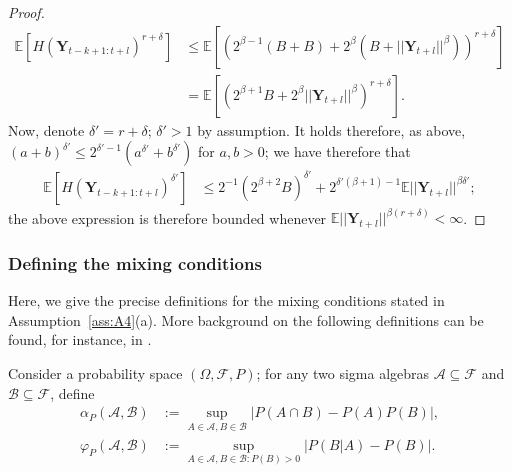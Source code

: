 \documentclass[twoside,11pt]{article}
\newcommand{\E}{\mathbb{E}}
\newcommand{\Ddobs}{\mathbf{Y}}
\begin{document}
\begin{proof}
\begin{equation}
\begin{aligned}
		\E\left[H(\Ddobs_{t-k+1:t+l})^{r+\delta}\right] &\le \E\left[\left(2^{\beta-1}(B + B)+ 2^\beta(B+||\Ddobs_{t+l}||^\beta) \right)^{r+\delta}\right] \\&=\E\left[\left( 2^{\beta+1}B + 2^\beta||\Ddobs_{t+l}||^\beta \right)^{r+\delta}\right].
		\end{aligned}
		\end{equation}
		Now, denote $ \delta' = r+\delta $; $\delta'>1$ by assumption. It holds therefore, as above, $ (a+b)^{\delta'}\le2^{\delta'-1}(a^{\delta'}+b^{\delta'}) $ for $ a,b>0 $; we have therefore that
		\begin{equation}\label{key}
		\begin{aligned}
		\E\left[H(\Ddobs_{t-k+1:t+l})^{\delta'}\right] &\le 2^{-1}\left( 2^{\beta+2}B\right)^{\delta'} +  2^{\delta'(\beta+1)-1}\E ||\Ddobs_{t+l}||^{\beta\delta'};
		\end{aligned}
		\end{equation}
		the above expression is therefore bounded whenever $ \E ||\Ddobs_{t+l}||^{\beta(r+\delta)} <\infty $.
	\end{proof}
	
	
	
	
	
	
	\subsubsection{Defining the mixing conditions}  \label{app:mixing}
	Here, we give the precise definitions for the mixing conditions stated in Assumption~\ref{ass:A4}(a). More background on the following definitions can be found, for instance, in \cite{bradley2005basic}.
	
	\begin{definition}
		Consider a probability space $ (\Omega, \mathcal{F}, P )$; for any two sigma algebras $ \mathcal{A} \subseteq\mathcal{F}$ and $ \mathcal{B} \subseteq\mathcal{F}$, define
		\begin{equation}\label{}
		\begin{aligned}
		\alpha_P(\mathcal{A}, \mathcal{B}) &:= \sup_{A\in\mathcal{A},B\in\mathcal{B}} \left|P(A\cap B) - P(A)P(B)\right|,\\
		\varphi_P(\mathcal{A}, \mathcal{B}) &:= \sup_{A\in\mathcal{A},B\in\mathcal{B}: P(B)>0} \left|P(B|A) - P(B)\right|.
		\end{aligned}
		\end{equation}
	\end{definition}
	
\end{document}
